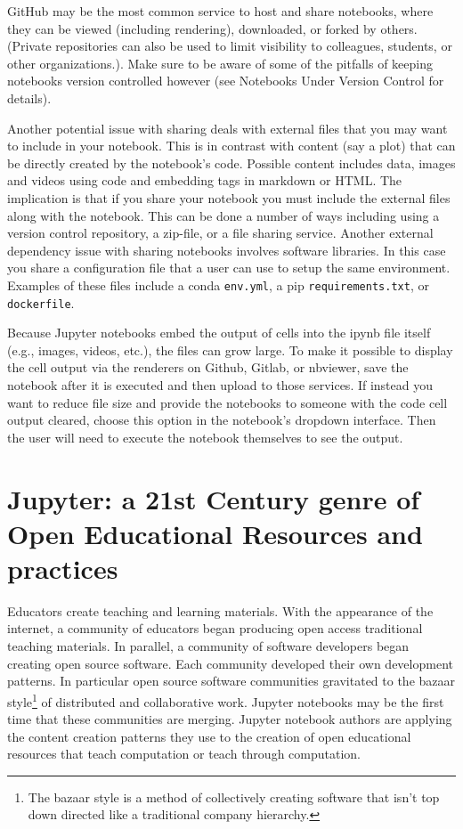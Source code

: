 \documentclass[]{book}
\let\rmarkdownfootnote\footnote%
\def\footnote{\protect\rmarkdownfootnote}
\begin{document}
GitHub may be the most common service to host and share notebooks, where
they can be viewed (including rendering), downloaded, or forked by
others. (Private repositories can also be used to limit visibility to
colleagues, students, or other organizations.). Make sure to be aware of
some of the pitfalls of keeping notebooks version controlled however
(see Notebooks Under Version Control for details).

Another potential issue with sharing deals with external files that you
may want to include in your notebook. This is in contrast with content
(say a plot) that can be directly created by the notebook's code.
Possible content includes data, images and videos using code and
embedding tags in markdown or HTML. The implication is that if you share
your notebook you must include the external files along with the
notebook. This can be done a number of ways including using a version
control repository, a zip-file, or a file sharing service. Another
external dependency issue with sharing notebooks involves software
libraries. In this case you share a configuration file that a user can
use to setup the same environment. Examples of these files include a
conda \texttt{env.yml}, a pip \texttt{requirements.txt}, or
\texttt{dockerfile}.

Because Jupyter notebooks embed the output of cells into the ipynb file
itself (e.g., images, videos, etc.), the files can grow large. To make
it possible to display the cell output via the renderers on Github,
Gitlab, or nbviewer, save the notebook after it is executed and then
upload to those services. If instead you want to reduce file size and
provide the notebooks to someone with the code cell output cleared,
choose this option in the notebook's dropdown interface. Then the user
will need to execute the notebook themselves to see the output.

\section{Jupyter: a 21st Century genre of Open Educational Resources and
practices}\label{jupyter-a-21st-century-genre-of-open-educational-resources-and-practices}

Educators create teaching and learning materials. With the appearance of
the internet, a community of educators began producing open access
traditional teaching materials. In parallel, a community of software
developers began creating open source software. Each community developed
their own development patterns. In particular open source software
communities gravitated to the bazaar style\footnote{The bazaar style is
  a method of collectively creating software that isn't top down
  directed like a traditional company hierarchy.} of distributed and
collaborative work. Jupyter notebooks may be the first time that these
communities are merging. Jupyter notebook authors are applying the
content creation patterns they use to the creation of open educational
resources that teach computation or teach through computation.
\end{document}
